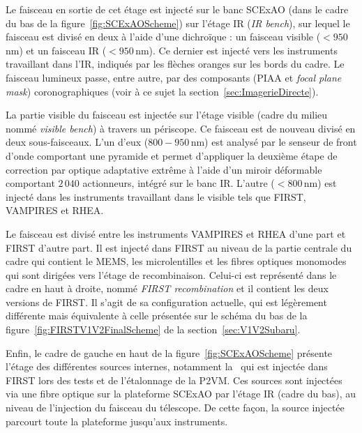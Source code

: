 Le faisceau en sortie de cet étage est injecté sur le banc \ac{SCExAO} (dans le cadre du bas de la figure~\ref{fig:SCExAOScheme}) sur l'étage \ac{IR} (\textit{IR bench}), sur lequel le faisceau est divisé en deux à l'aide d'une dichroïque : un faisceau visible ($< 950 \,$nm) et un faisceau \ac{IR} ($< 950 \,$nm). Ce dernier est injecté vers les instruments travaillant dans l'\ac{IR}, indiqués par les flèches oranges sur les bords du cadre. Le faisceau lumineux passe, entre autre, par des composants (\ac{PIAA} et \textit{focal plane mask}) coronographiques (voir à ce sujet la section~\ref{sec:ImagerieDirecte}).

La partie visible du faisceau est injectée sur l'étage visible (cadre du milieu nommé \textit{visible bench}) à travers un périscope. Ce faisceau est de nouveau divisé en deux sous-faisceaux. L'un d'eux ($800 - 950 \,$nm) est analysé par le senseur de front d'onde comportant une pyramide \citep{lozi2019} et permet d'appliquer la deuxième étape de correction par optique adaptative extrême à l'aide d'un miroir déformable comportant $2\,040$ actionneurs, intégré sur le banc \ac{IR}. L'autre ($< 800 \,$nm) est injecté dans les instruments travaillant dans le visible tels que \ac{FIRST}, \ac{VAMPIRES} et \ac{RHEA}.

Le faisceau est divisé entre les instruments \ac{VAMPIRES} et \ac{RHEA} d'une part et \ac{FIRST} d'autre part. Il est injecté dans \ac{FIRST} au niveau de la partie centrale du cadre qui contient le \ac{MEMS}, les microlentilles et les fibres optiques monomodes qui sont dirigées vers l'étage de recombinaison. Celui-ci est représenté dans le cadre en haut à droite, nommé \textit{FIRST recombination} et il contient les deux versions de \ac{FIRST}. Il s'agit de sa configuration actuelle, qui est légèrement différente mais équivalente à celle présentée sur le schéma du bas de la figure~\ref{fig:FIRSTV1V2FinalScheme} de la section~\ref{sec:V1V2Subaru}.

Enfin, le cadre de gauche en haut de la figure~\ref{fig:SCExAOScheme} présente l'étage des différentes sources internes, notamment la \sk~qui est injectée dans \ac{FIRST} lors des tests et de l'étalonnage de la \ac{P2VM}. Ces sources sont injectées via une fibre optique sur la plateforme \ac{SCExAO} par l'étage \ac{IR} (cadre du bas), au niveau de l'injection du faisceau du télescope. De cette façon, la source injectée parcourt toute la plateforme jusqu'aux instruments.

